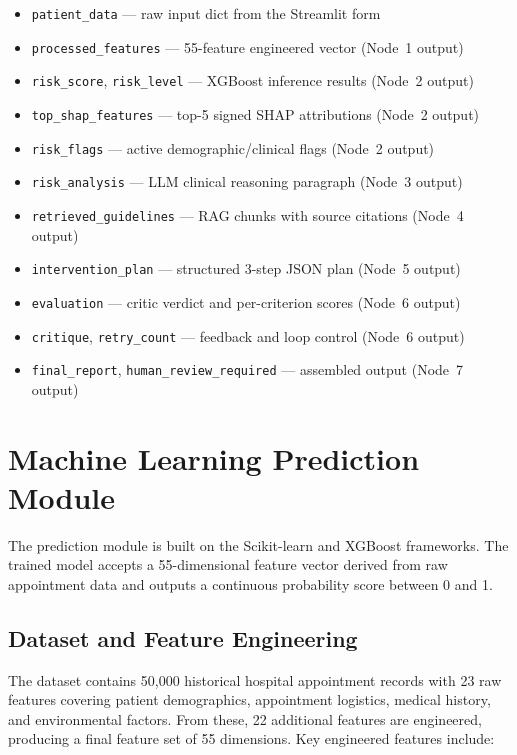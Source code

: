 \documentclass[12pt, a4paper]{report}
\begin{document}
\begin{itemize}
  \item \texttt{patient\_data} --- raw input dict from the Streamlit form
  \item \texttt{processed\_features} --- 55-feature engineered vector (Node~1 output)
  \item \texttt{risk\_score}, \texttt{risk\_level} --- XGBoost inference results (Node~2 output)
  \item \texttt{top\_shap\_features} --- top-5 signed SHAP attributions (Node~2 output)
  \item \texttt{risk\_flags} --- active demographic/clinical flags (Node~2 output)
  \item \texttt{risk\_analysis} --- LLM clinical reasoning paragraph (Node~3 output)
  \item \texttt{retrieved\_guidelines} --- RAG chunks with source citations (Node~4 output)
  \item \texttt{intervention\_plan} --- structured 3-step JSON plan (Node~5 output)
  \item \texttt{evaluation} --- critic verdict and per-criterion scores (Node~6 output)
  \item \texttt{critique}, \texttt{retry\_count} --- feedback and loop control (Node~6 output)
  \item \texttt{final\_report}, \texttt{human\_review\_required} --- assembled output (Node~7 output)
\end{itemize}

\section{Machine Learning Prediction Module}

The prediction module is built on the Scikit-learn and XGBoost frameworks. The trained model accepts a 55-dimensional feature vector derived from raw appointment data and outputs a continuous probability score between 0 and 1.

\subsection{Dataset and Feature Engineering}

The dataset contains 50,000 historical hospital appointment records with 23 raw features covering patient demographics, appointment logistics, medical history, and environmental factors. From these, 22 additional features are engineered, producing a final feature set of 55 dimensions. Key engineered features include:
\end{document}
